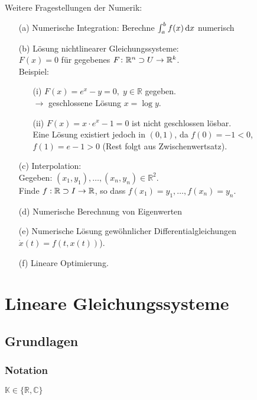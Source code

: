 Weitere Fragestellungen der Numerik:
\begin{enumerate}
\item[(a)]
Numerische Integration: Berechne $\int_a^b f(x) \,\mathrm d x$ numerisch
\item[(b)]
Lösung nichtlinearer Gleichungssysteme: \\
$F(x) = 0$ für gegebenes $F\colon \mathbb R^n \supset U \rightarrow \mathbb{R}^k$. \\
Beispiel:
\begin{enumerate}
\item[(i)]
$F(x)=e^x-y = 0,\; y \in \mathbb{R}$ gegeben. \\
$\rightarrow$ geschlossene Lösung $x = \log y.$
\item[(ii)]
$F(x)=x \cdot e^x -1 = 0$ ist nicht geschlossen lösbar. \\
Eine Lösung existiert jedoch in $(0,1)$, da $f(0) = -1 < 0$, \\
$f(1)= e-1>0 $ (Rest folgt aus Zwischenwertsatz).
\end{enumerate}
\item[(c)]
Interpolation: \\
Gegeben: $(x_1,y_1), \dots, (x_n,y_n) \in \mathbb{R}^2$. \\
Finde $f: \mathbb R \supset I \to \mathbb R$, so dass 
$f(x_1) = y_1, \dots , f(x_n)=y_n$.
\item[(d)]
Numerische Berechnung von Eigenwerten
\item[(e)]
Numerische Lösung gewöhnlicher Differentialgleichungen $\dot x(t)=f(t,x(t))$).
\item[(f)]
Lineare Optimierung.
\end{enumerate}

\newpage
\section{Lineare Gleichungssysteme}

\subsection{Grundlagen}

\subsubsection{Notation}

$\mathbb{K} \in \{\mathbb{R}, \mathbb{C}\}$ \\

